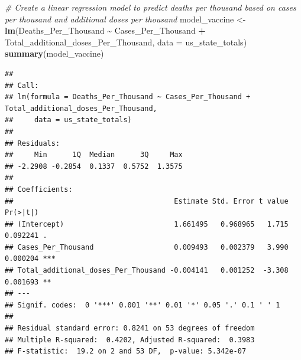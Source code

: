 \documentclass[
]{article}
\newenvironment{Shaded}{\begin{snugshade}}{\end{snugshade}}
\newcommand{\AttributeTok}[1]{\textcolor[rgb]{0.13,0.29,0.53}{#1}}
\newcommand{\CommentTok}[1]{\textcolor[rgb]{0.56,0.35,0.01}{\textit{#1}}}
\newcommand{\FunctionTok}[1]{\textcolor[rgb]{0.13,0.29,0.53}{\textbf{#1}}}
\newcommand{\NormalTok}[1]{#1}
\newcommand{\OtherTok}[1]{\textcolor[rgb]{0.56,0.35,0.01}{#1}}
\newcommand{\SpecialCharTok}[1]{\textcolor[rgb]{0.81,0.36,0.00}{\textbf{#1}}}
\begin{document}
\begin{Shaded}
\begin{Highlighting}[]
\CommentTok{\# Create a linear regression model to predict deaths per thousand based on cases per thousand and additional doses per thousand}
\NormalTok{model\_vaccine }\OtherTok{\textless{}{-}} \FunctionTok{lm}\NormalTok{(Deaths\_Per\_Thousand }\SpecialCharTok{\textasciitilde{}}\NormalTok{ Cases\_Per\_Thousand }\SpecialCharTok{+}\NormalTok{ Total\_additional\_doses\_Per\_Thousand, }\AttributeTok{data =}\NormalTok{ us\_state\_totals)}
\FunctionTok{summary}\NormalTok{(model\_vaccine)}
\end{Highlighting}
\end{Shaded}

\begin{verbatim}
## 
## Call:
## lm(formula = Deaths_Per_Thousand ~ Cases_Per_Thousand + Total_additional_doses_Per_Thousand, 
##     data = us_state_totals)
## 
## Residuals:
##     Min      1Q  Median      3Q     Max 
## -2.2908 -0.2854  0.1337  0.5752  1.3575 
## 
## Coefficients:
##                                      Estimate Std. Error t value Pr(>|t|)    
## (Intercept)                          1.661495   0.968965   1.715 0.092241 .  
## Cases_Per_Thousand                   0.009493   0.002379   3.990 0.000204 ***
## Total_additional_doses_Per_Thousand -0.004141   0.001252  -3.308 0.001693 ** 
## ---
## Signif. codes:  0 '***' 0.001 '**' 0.01 '*' 0.05 '.' 0.1 ' ' 1
## 
## Residual standard error: 0.8241 on 53 degrees of freedom
## Multiple R-squared:  0.4202, Adjusted R-squared:  0.3983 
## F-statistic:  19.2 on 2 and 53 DF,  p-value: 5.342e-07
\end{verbatim}
\end{document}
